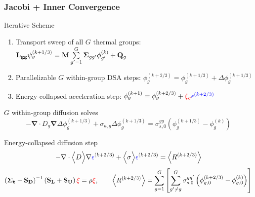 \documentclass[compress,10pt]{beamer}
\renewcommand{\vec}[1]{\mathbf{#1}}
\newcommand{\tcr}[1]{\textcolor{red}{#1}}
\newcommand{\tcb}[1]{\textcolor{blue}{#1}}
\begin{document}
\begin{frame}[t]\frametitle{\small Jacobi + Inner Convergence}
\vspace{-1mm}
\begin{block}{Iterative Scheme}{\small
\begin{enumerate}
\item <1-> {Transport sweep of all $G$ thermal groups: ${\bf L_{gg}} \psi_g^{(k+1/3)} = {\bf M} \sum\limits_{g'=1}^G {\bf \Sigma}_{g g'} \phi_{g'}^{(k)} + {\bf Q}_g$}
\item <2-> {Parallelizable $G$ within-group DSA steps: $\phi_{g}^{(k+2/3)} = \phi_{g}^{(k+1/3)} + \Delta \phi_g^{(k+1/3)}$}
\item <3-> {Energy-collapsed acceleration step: $\phi_{g}^{(k+1)} = \phi_{g}^{(k+2/3)} + \tcr{\xi_g} \tcb{\epsilon^{(k+2/3)}}$ }
\end{enumerate}
}\end{block}
\vspace{-1mm}
{
\begin{block}{\small $G$ within-group diffusion solves}{\small
\begin{equation*}
- \vec{\nabla} \cdot D_g \vec{\nabla} \Delta \phi_g^{(k+1/3)} + \sigma_{a,g} \Delta \phi_g^{(k+1/3)} = \sigma_{s,0}^{gg} \left( \phi_g^{(k+1/3)} - \phi_g^{(k)}  \right)
\end{equation*}
}\end{block}
}
\vspace{-1mm}
{
\begin{block}{\small Energy-collapsed diffusion step}{\footnotesize
\begin{equation*}
- \vec{\nabla} \cdot\Big< D \Big> \vec{\nabla}  \tcb{\epsilon}^{(k+2/3)} + \Big< \sigma \Big>  \tcb{\epsilon}^{(k+2/3)} = \Big< R^{(k+2/3)} \Big>
\end{equation*}
\vspace{2mm}
\begin{equation*}
 \left(  {\bf \Sigma_t} - {\bf S_{D}}  \right)^{-1} \left( {\bf S_{L}} + {\bf S_{U}} \right) {\bf \tcr{\xi}}=\rho {\bf \tcr{\xi}}, \qquad \Big< R^{(k+2/3)} \Big> = 
\sum\limits_{g=1}^G \left[ \sum\limits_{g' \neq g}^G \sigma_{s,0}^{gg'} \left( \phi_{g,0}^{(k+2/3)} - \phi_{g,0}^{(k)}  \right)\right]
\end{equation*}
}\end{block}
}
\end{frame}
\end{document}
